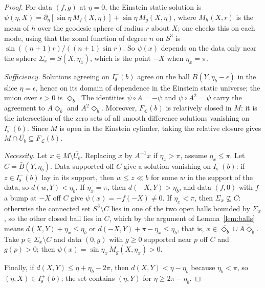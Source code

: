\documentclass[11pt]{article}
\theoremstyle{definition}
\newcommand{\Is}{I^-_{\mathrm s}}
\newcommand{\Isp}{I^+_{\mathrm s}}
\begin{document}
\begin{proof}
For data $(f,g)$ at $\eta=0$, the Einstein static solution is
$\psi(\eta,X)=\partial_\eta[\sin\eta\,M_f(X,\eta)]+\sin\eta\,M_g(X,\eta)$, where
$M_h(X,r)$ is the mean of $h$ over the geodesic sphere of radius $r$ about
$X$; one checks this on each mode, using that the zonal function of degree $n$
on $S^3$ is $\sin((n+1)r)/((n+1)\sin r)$. So $\psi(x)$ depends on the data only
near the sphere $\Sigma_x=S(X,\eta_x)$, which is the point $-X$ when $\eta_x=\pi$.

\emph{Sufficiency.} Solutions agreeing on $\Is(b)$ agree on the ball
$B(Y,\eta_b-\epsilon)$ in the slice $\eta=\epsilon$, hence on its domain of
dependence in the Einstein static universe; the union over $\epsilon>0$ is
$\Diamond_b$. The identities $\psi\circ A=-\psi$ and $\psi\circ A^2=\psi$ carry
the agreement to $A\Diamond_b$ and $A^2\Diamond_b$.
Moreover, $F_{\mathcal L}(b)$ is relatively closed in $M$: it is the
intersection of the zero sets of all smooth difference solutions vanishing
on $\Is(b)$. Since $M$ is open in the Einstein cylinder, taking the relative
closure gives $M\cap\overline{U_b}\subseteq F_{\mathcal L}(b)$.

\emph{Necessity.} Let $x\in M\setminus\overline{U_b}$. Replacing $x$ by
$A^{-1}x$ if $\eta_x>\pi$, assume $\eta_x\le\pi$. Let $C=\bar B(Y,\eta_b)$.
Data supported off $C$ give a solution vanishing on $\Is(b)$: if $z\in\Is(b)$
lay in its support, then $w\le z\ll b$ for some $w$ in the support of the data,
so $d(w,Y)<\eta_b$. If $\eta_x=\pi$, then $d(-X,Y)>\eta_b$, and data
$(f,0)$ with $f$ a bump at $-X$ off $C$ give $\psi(x)=-f(-X)\neq0$. If
$\eta_x<\pi$, then $\Sigma_x\not\subseteq C$: otherwise the connected set
$S^3\setminus C$ lies in one of the two open balls bounded by $\Sigma_x$, so
the other closed ball lies in $C$, which by the argument of
Lemma~\ref{lem:balls} means
$d(X,Y)+\eta_x\le\eta_b$ or $d(-X,Y)+\pi-\eta_x\le\eta_b$, that is,
$x\in\overline{\Diamond_b}\cup\overline{A\Diamond_b}$. Take $p\in\Sigma_x\setminus C$
and data $(0,g)$ with $g\ge0$ supported near $p$ off $C$ and $g(p)>0$; then
$\psi(x)=\sin\eta_x\,M_g(X,\eta_x)>0$.

Finally, if $d(X,Y)\le\eta+\eta_b-2\pi$, then $d(X,Y)<\eta-\eta_b$ because
$\eta_b<\pi$, so $(\eta,X)\in\Isp(b)$; the set contains $(\eta,Y)$ for
$\eta\ge2\pi-\eta_b$.
\end{proof}
\end{document}
